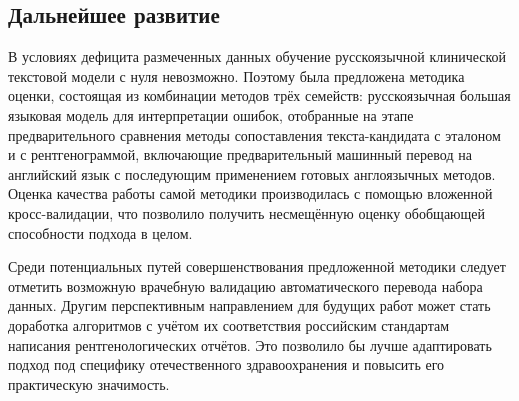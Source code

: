 \subsection{Дальнейшее развитие}
В условиях дефицита размеченных данных обучение русскоязычной клинической текстовой модели с нуля невозможно. Поэтому была предложена методика оценки, состоящая из комбинации методов трёх семейств: русскоязычная большая языковая модель для интерпретации ошибок, отобранные на этапе предварительного сравнения методы сопоставления текста-кандидата с эталоном и с рентгенограммой, включающие предварительный машинный перевод на английский язык с последующим применением готовых англоязычных методов. Оценка качества работы самой методики производилась с помощью вложенной кросс-валидации, что позволило получить несмещённую оценку обобщающей способности подхода в целом.

Среди потенциальных путей совершенствования предложенной методики следует отметить возможную врачебную валидацию автоматического перевода набора данных. Другим перспективным направлением для будущих работ может стать доработка алгоритмов с учётом их соответствия российским стандартам написания рентгенологических отчётов. Это позволило бы лучше адаптировать подход под специфику отечественного здравоохранения и повысить его практическую значимость.